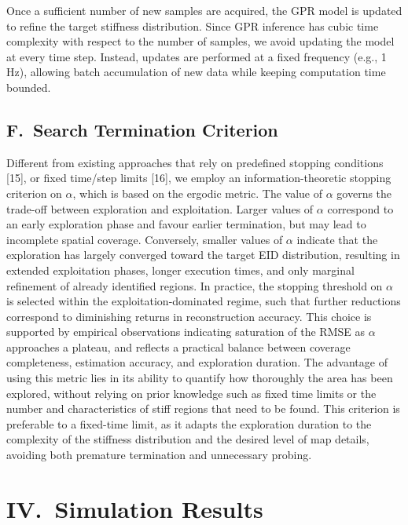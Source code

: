 \documentclass[11pt]{article}
\begin{document}
Once a sufficient number of new samples are acquired, the GPR model
is updated to refine the target stiffness distribution. Since GPR
inference has cubic time complexity with respect to the number of
samples, we avoid updating the model at every time step. Instead,
updates are performed at a fixed frequency (e.g., 1 Hz), allowing
batch accumulation of new data while keeping computation time
bounded.

\subsection*{F.\ Search Termination Criterion}

Different from existing approaches that rely on predefined stopping
conditions [15], or fixed time/step limits [16], we employ an
information-theoretic stopping criterion on $\alpha$, which is based
on the ergodic metric. The value of $\alpha$ governs the trade-off
between exploration and exploitation. Larger values of $\alpha$
correspond to an early exploration phase and favour earlier
termination, but may lead to incomplete spatial coverage. Conversely,
smaller values of $\alpha$ indicate that the exploration has largely
converged toward the target EID distribution, resulting in extended
exploitation phases, longer execution times, and only marginal
refinement of already identified regions. In practice, the stopping
threshold on $\alpha$ is selected within the exploitation-dominated
regime, such that further reductions correspond to diminishing
returns in reconstruction accuracy. This choice is supported by
empirical observations indicating saturation of the RMSE as $\alpha$
approaches a plateau, and reflects a practical balance between
coverage completeness, estimation accuracy, and exploration duration.
The advantage of using this metric lies in its ability to quantify
how thoroughly the area has been explored, without relying on prior
knowledge such as fixed time limits or the number and characteristics
of stiff regions that need to be found. This criterion is preferable
to a fixed-time limit, as it adapts the exploration duration to the
complexity of the stiffness distribution and the desired level of map
details, avoiding both premature termination and unnecessary probing.

\section*{IV.\ Simulation Results}
\end{document}
